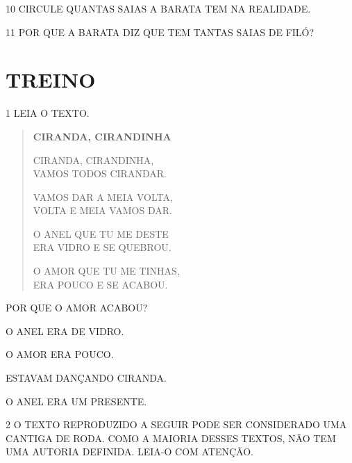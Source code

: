 \num{10} CIRCULE QUANTAS SAIAS A BARATA TEM NA REALIDADE. 

\vspace{0.3cm}

\num{11} POR QUE A BARATA DIZ QUE TEM TANTAS SAIAS DE FILÓ?


\section*{TREINO}


\num{1} LEIA O TEXTO.

\begin{myquote}
\begin{verse}
\textbf{CIRANDA, CIRANDINHA}

CIRANDA, CIRANDINHA,\\
VAMOS TODOS CIRANDAR.

VAMOS DAR A MEIA VOLTA,\\
VOLTA E MEIA VAMOS DAR.

O ANEL QUE TU ME DESTE\\
ERA VIDRO E SE QUEBROU.

O AMOR QUE TU ME TINHAS,\\
ERA POUCO E SE ACABOU.
\end{verse}

\end{myquote}

POR QUE O AMOR ACABOU?

\begin{escolha}
\item O ANEL ERA DE VIDRO.

\item O AMOR ERA POUCO.

\item ESTAVAM DANÇANDO CIRANDA.

\item O ANEL ERA UM PRESENTE.
\end{escolha}

\num{2} O TEXTO REPRODUZIDO A SEGUIR PODE SER 
CONSIDERADO UMA CANTIGA DE RODA. COMO A MAIORIA DESSES
TEXTOS, NÃO TEM UMA AUTORIA DEFINIDA. LEIA-O COM ATENÇÃO.

